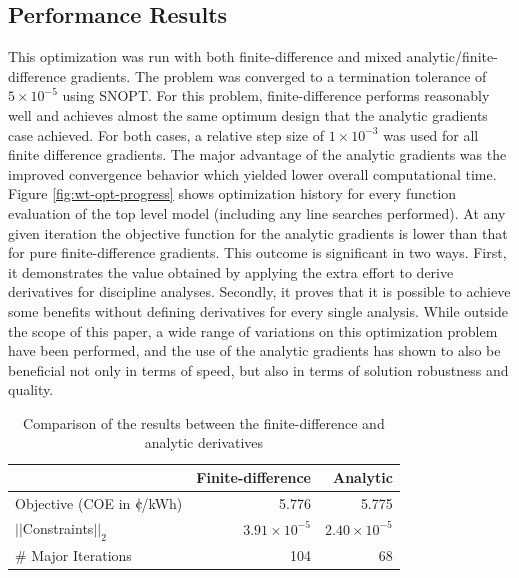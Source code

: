 \documentclass[]{aiaa-tc} %
\newcommand{\cent}{{\mathrm{c}\mkern-6.5mu{\mid}}}
\begin{document}
    \subsection{Performance Results}
        This optimization was run with both finite-difference and mixed analytic/finite-difference gradients.  The problem was converged to a termination tolerance of $5\times10^{-5}$ using SNOPT.  For this problem, finite-difference performs reasonably well and achieves almost the same optimum design that the analytic gradients case achieved. For both cases, a relative step size of $1\times10^{-3}$ was used for all 
        finite difference gradients. The major advantage of the analytic gradients was the improved convergence
        behavior which yielded lower overall computational time.  Figure \ref{fig:wt-opt-progress} shows optimization 
        history for every function evaluation of the top level model (including any line searches performed). At any given iteration the objective function for the analytic gradients is lower than that for pure finite-difference gradients. This outcome is significant in two ways. First, it demonstrates the value obtained by applying the extra effort to derive derivatives for discipline analyses. Secondly, it proves that it is possible to achieve some benefits without defining derivatives for every single analysis. While outside the scope of this paper, a wide range of variations on this optimization problem have been performed, and the use of the analytic gradients has shown to also be beneficial not only in terms of speed, but also in terms of solution robustness and quality.  



        \begin{table}
            \centering
            \caption{Comparison of the results between the finite-difference and analytic derivatives}
            \begin{tabular}{lrr}
                \toprule
                             & Finite-difference & Analytic \\
                \midrule
                Objective (COE  in $\cent$/kWh)         & 5.776  & 5.775 \\  \hline
                $||$Constraints$||_2$                  & $3.91\times10^{-5}$ & $2.40\times10^{-5}$  \\  \hline
                \# Major Iterations                   &  104 & 68  \\ 
                \bottomrule
            \end{tabular}   
            \label{tab:wt-fd-speeds}
        \end{table}
\end{document}
